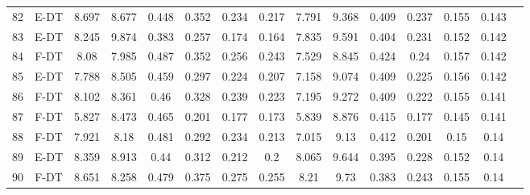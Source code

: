 \begin{longtable}{@{\hskip3pt}c@{\hskip3pt}c@{\hskip3pt}c@{\hskip3pt}c@{\hskip3pt}c@{\hskip3pt}c@{\hskip3pt}c@{\hskip3pt}c@{\hskip3pt}c@{\hskip3pt}c@{\hskip3pt}c@{\hskip3pt}c@{\hskip3pt}c@{\hskip3pt}c@{\hskip3pt}c}
         82 &           E-DT &             8.697 &          8.677 &           0.448 &           0.352 &           0.234 &           0.217 &               7.791 &           9.368 &           0.409 &         0.237 &          0.155 &           0.143 \\
         83 &           E-DT &             8.245 &          9.874 &           0.383 &           0.257 &           0.174 &           0.164 &               7.835 &           9.591 &           0.404 &         0.231 &          0.152 &           0.142 \\
         84 &           F-DT &              8.08 &          7.985 &           0.487 &           0.352 &           0.256 &           0.243 &               7.529 &           8.845 &           0.424 &          0.24 &          0.157 &           0.142 \\
         85 &           E-DT &             7.788 &          8.505 &           0.459 &           0.297 &           0.224 &           0.207 &               7.158 &           9.074 &           0.409 &         0.225 &          0.156 &           0.142 \\
         86 &           F-DT &             8.102 &          8.361 &            0.46 &           0.328 &           0.239 &           0.223 &               7.195 &           9.272 &           0.409 &         0.222 &          0.155 &           0.141 \\
         87 &           F-DT &             5.827 &          8.473 &           0.465 &           0.201 &           0.177 &           0.173 &               5.839 &           8.876 &           0.415 &         0.177 &          0.145 &           0.141 \\
         88 &           F-DT &             7.921 &           8.18 &           0.481 &           0.292 &           0.234 &           0.213 &               7.015 &            9.13 &           0.412 &         0.201 &           0.15 &            0.14 \\
         89 &           E-DT &             8.359 &          8.913 &            0.44 &           0.312 &           0.212 &             0.2 &               8.065 &           9.644 &           0.395 &         0.228 &          0.152 &            0.14 \\
         90 &           F-DT &             8.651 &          8.258 &           0.479 &           0.375 &           0.275 &           0.255 &                8.21 &            9.73 &           0.383 &         0.243 &          0.155 &            0.14 \\

\end{longtable}
